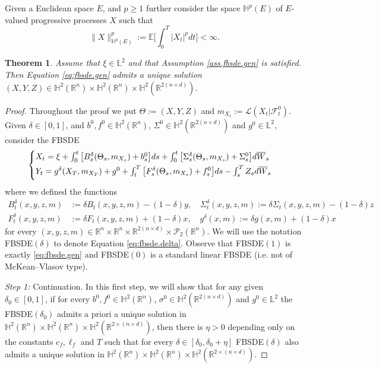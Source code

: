 \documentclass[11pt,reqno]{amsart}
\numberwithin{equation}{section}
\newtheorem{theorem}{Theorem}[section]
\theoremstyle{definition}
\def\E{{\mathbb E}}
\def\R{{\mathbb R}}
\def\L{{\mathcal L}}
\newcommand{\ov}{\overline}
\newcommand\cF{\mathcal F}
\newcommand\cL{\mathcal L}
\newcommand\cP{\mathcal P}
\def \E{\mathbb{E}}
\def \H{\mathbb{H}}
\def \L{\mathbb{L}}
\def \R{\mathbb{R}}
\begin{document}
Given a Euclidean space $E$, and $p\ge1$ further consider the space $\H^p(E)$ of $E$-valued progressive processes $X$ such that
\begin{equation*}
  \|X\|_{\H^p(E)}^p := \E\bigg[\int_0^T|X_t|^pdt\bigg]<\infty.
\end{equation*}
\begin{theorem}
\label{thm.gen-existence}
  Assume that $\xi\in \L^2$ and that Assumption \ref{ass.fbsde.gen} is satisfied. 
  Then Equation \ref{eq:fbsde.gen} admits a unique solution $(X, Y, Z) \in \H^2(\R^n)\times \H^2(\R^n)\times \H^2(\R^{2(n\times d)})$.
\end{theorem}

\begin{proof}
  Throughout the proof we put $\Theta := (X, Y, Z)$ and $m_{X_t}:=\cL(X_t|\cF^0_t)$.
  Given $\delta \in [0,1]$, and $b^0, f^0\in \H^2(\R^n)$, $\Sigma^0\in \H^2(\R^{2(n\times d)})$ and $g^0\in \L^2$, consider the FBSDE 
  \begin{equation}
    \label{eq:fbsde.delta}
    \begin{cases}\vspace{.1cm}
      X_t = \xi + \int_0^t\big[ B^\delta_s(\Theta_s, m_{X_s}) + b^0_s \big] ds + \int_0^t\big[\Sigma^\delta_s(\Theta_s,m_{X_s}) + \Sigma^0_s\big]d\ov W_s\\\vspace{.1cm}
    Y_t = g^\delta(X_T, m_{X_T}) + g^0 + \int_t^T\big[F^\delta_s(\Theta_s,m_{X_s}) + f^0_s\big]ds - \int_s^TZ_sd\ov W_s
    \end{cases}
  \end{equation}
  where we defined the functions
  \begin{align*}
    B^\delta_t(x, y, z,m) &:= \delta B_t(x, y, z,m) - (1 - \delta)y,\quad \Sigma^\delta_t(x, y, z,m) := \delta\Sigma_t(x, y, z,m) -(1 - \delta) z\\
    F^\delta_t(x, y, z, m) &:= \delta F_t(x, y, z, m) + (1 - \delta)x,\quad g^\delta(x, m) := \delta g(x,m) + (1 - \delta)x
  \end{align*}
  for every $(x, y, z, m)\in \R^n\times \R^n \times \R^{2(n\times d)}\times \cP_2(\R^n)$.
  We will use the notation FBSDE$(\delta)$ to denote Equation \eqref{eq:fbsde.delta}.
  Observe that FBSDE$(1)$ is exactly \eqref{eq:fbsde.gen} and FBSDE$(0)$ is a standard linear FBSDE (i.e. not of McKean--Vlasov type).

  \emph{Step 1:} Continuation. 
  In this first step, we will show that for any given $\delta_0\in [0,1]$, if for every $b^0, f^0\in \H^2(\R^n)$, $\sigma^0\in \H^2(\R^{2(n\times d)})$ and $g^0\in \L^2$ the FBSDE$(\delta_0)$ admits a priori a unique solution in $\H^2(\R^n)\times \H^2(\R^n)\times \H^2(\R^{2\times(n\times d)})$, then there is $\eta>0$ depending only on the constants $c_f,\ell_f $ and $T$ such that for every $\delta \in [\delta_0, \delta_0+\eta]$ FBSDE$(\delta)$ also admits a unique solution in $\H^2(\R^n)\times \H^2(\R^n)\times \H^2(\R^{2\times(n\times d)})$.


\end{proof}
\end{document}
